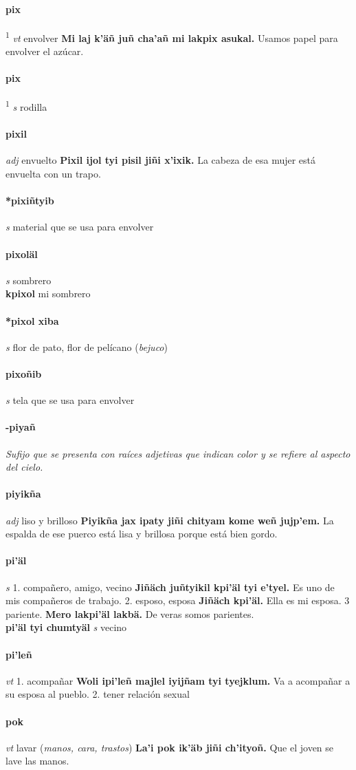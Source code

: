 \documentclass{scrbook}
\newcommand{\entry}[1]{\paragraph{#1}}
\newcommand{\onedefinition}[1]{#1.}
\newcommand{\defsuperscript}[1]{\textsuperscript{1}}
\newcommand{\nontranslationdef}[1]{\textit{#1}}
\newcommand{\partofspeech}[1]{\textit{#1}}
\newcommand{\spanishtranslation}[1]{#1}
\newcommand{\clarification}[1]{(\textit{#1})}
\newcommand{\cholexample}[1]{\textbf{#1}}
\newcommand{\exampletranslation}[1]{#1}
\newcommand{\secondaryentry}[1]{\\\textbf{#1}}
\newcommand{\secondpartofspeech}[1]{\textit{#1}}
\newcommand{\secondtranslation}[1]{#1}
\begin{document}
\begin{multicols}{2}
\entry{pix}
\defsuperscript{1}
\partofspeech{vt}
\spanishtranslation{envolver}
\cholexample{Mi laj k'äñ juñ cha'añ mi lakpix asukal.}
\exampletranslation{Usamos papel para envolver el azúcar.}

\entry{pix}
\defsuperscript{2}
\partofspeech{s}
\spanishtranslation{rodilla}

\entry{pixil}
\partofspeech{adj}
\spanishtranslation{envuelto}
\cholexample{Pixil ijol tyi pisil jiñi x'ixik.}
\exampletranslation{La cabeza de esa mujer está envuelta con un trapo.}

\entry{*pixiñtyib}
\partofspeech{s}
\spanishtranslation{material que se usa para envolver}

\entry{pixoläl}
\partofspeech{s}
\spanishtranslation{sombrero}
\secondaryentry{kpixol}
\secondtranslation{mi sombrero}

\entry{*pixol xiba}
\partofspeech{s}
\spanishtranslation{flor de pato, flor de pelícano}
\clarification{bejuco}

\entry{pixoñib}
\partofspeech{s}
\spanishtranslation{tela que se usa para envolver}

\entry{-piyañ}
\nontranslationdef{Sufijo que se presenta con raíces adjetivas que indican color y se refiere al aspecto del cielo.}

\entry{piyikña}
\partofspeech{adj}
\spanishtranslation{liso y brilloso}
\cholexample{Piyikña jax ipaty jiñi chityam kome weñ jujp'em.}
\exampletranslation{La espalda de ese puerco está lisa y brillosa porque está bien gordo.}

\entry{pi'äl}
\partofspeech{s}
\onedefinition{1}
\spanishtranslation{compañero, amigo, vecino}
\cholexample{Jiñäch juñtyikil kpi'äl tyi e'tyel.}
\exampletranslation{Es uno de mis compañeros de trabajo.}
\onedefinition{2}
\spanishtranslation{esposo, esposa}
\cholexample{Jiñäch kpi'äl.}
\exampletranslation{Ella es mi esposa.}
\onedefinition{3 pariente}
\cholexample{Mero lakpi'äl lakbä.}
\exampletranslation{De veras somos parientes.}
\secondaryentry{pi'äl tyi chumtyäl}
\secondpartofspeech{s}
\secondtranslation{vecino}

\entry{pi'leñ}
\partofspeech{vt}
\onedefinition{1}
\spanishtranslation{acompañar}
\cholexample{Woli ipi'leñ majlel iyijñam tyi tyejklum.}
\exampletranslation{Va a acompañar a su esposa al pueblo.}
\onedefinition{2}
\spanishtranslation{tener relación sexual}

\entry{pok}
\partofspeech{vt}
\spanishtranslation{lavar}
\clarification{manos, cara, trastos}
\cholexample{La'i pok ik'äb jiñi ch'ityoñ.}
\exampletranslation{Que el joven se lave las manos.}


\end{multicols}
\end{document}
